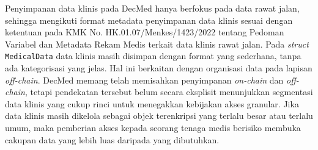 Penyimpanan data klinis pada DecMed hanya berfokus pada data rawat jalan, sehingga mengikuti format metadata penyimpanan data klinis sesuai dengan ketentuan pada KMK No. HK.01.07/Menkes/1423/2022 \autocite{kemenkes1423-2022} tentang Pedoman Variabel dan Metadata Rekam Medis terkait data klinis rawat jalan. Pada \textit{struct} \texttt{MedicalData} data klinis masih disimpan dengan format yang sederhana, tanpa ada kategorisasi yang jelas. Hal ini berkaitan dengan organisasi data pada lapisan \textit{off-chain}. DecMed memang telah memisahkan penyimpanan \textit{on-chain} dan \textit{off-chain}, tetapi pendekatan tersebut belum secara eksplisit menunjukkan segmentasi data klinis yang cukup rinci untuk menegakkan kebijakan akses granular. Jika data klinis masih dikelola sebagai objek terenkripsi yang terlalu besar atau terlalu umum, maka pemberian akses kepada seorang tenaga medis berisiko membuka cakupan data yang lebih luas daripada yang dibutuhkan.



